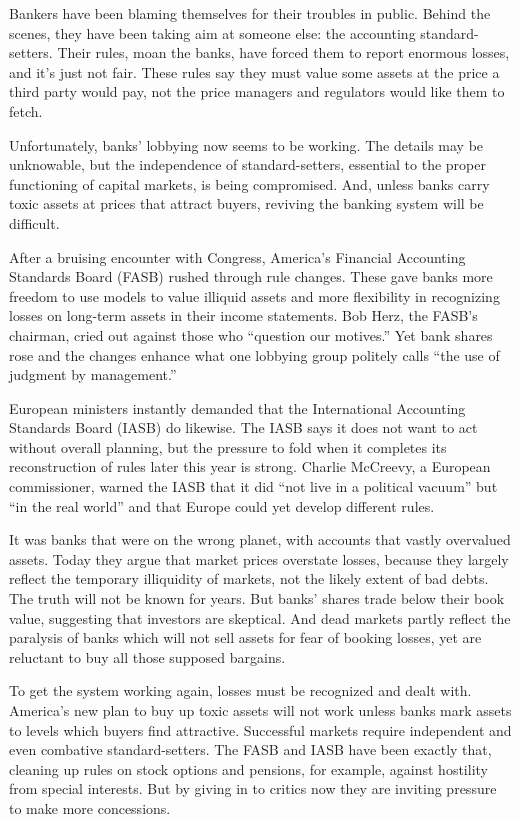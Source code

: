Bankers have been blaming themselves for their troubles in public. Behind the scenes, they have been taking aim at someone else: the accounting standard-setters. Their rules, moan the banks, have forced them to report enormous losses, and it's just not fair. These rules say they must value some assets at the price a third party would pay, not the price managers and regulators would like them to fetch.


Unfortunately, banks' lobbying now seems to be working. The details may be unknowable, but the independence of standard-setters, essential to the proper functioning of capital markets, is being compromised. And, unless banks carry toxic assets at prices that attract buyers, reviving the banking system will be difficult.


After a bruising encounter with Congress, America's Financial Accounting Standards Board (FASB) rushed through rule changes. These gave banks more freedom to use models to value illiquid assets and more flexibility in recognizing losses on long-term assets in their income statements. Bob Herz, the FASB's chairman, cried out against those who ``question our motives.'' Yet bank shares rose and the changes enhance what one lobbying group politely calls ``the use of judgment by management.''


European ministers instantly demanded that the International Accounting Standards Board (IASB) do likewise. The IASB says it does not want to act without overall planning, but the pressure to fold when it completes its reconstruction of rules later this year is strong. Charlie McCreevy, a European commissioner, warned the IASB that it did ``not live in a political vacuum'' but ``in the real world'' and that Europe could yet develop different rules.


It was banks that were on the wrong planet, with accounts that vastly overvalued assets. Today they argue that market prices overstate losses, because they largely reflect the temporary illiquidity of markets, not the likely extent of bad debts. The truth will not be known for years. But banks' shares trade below their book value, suggesting that investors are skeptical. And dead markets partly reflect the paralysis of banks which will not sell assets for fear of booking losses, yet are reluctant to buy all those supposed bargains.


To get the system working again, losses must be recognized and dealt with. America's new plan to buy up toxic assets will not work unless banks mark assets to levels which buyers find attractive. Successful markets require independent and even combative standard-setters. The FASB and IASB have been exactly that, cleaning up rules on stock options and pensions, for example, against hostility from special interests. But by giving in to critics now they are inviting pressure to make more concessions.


